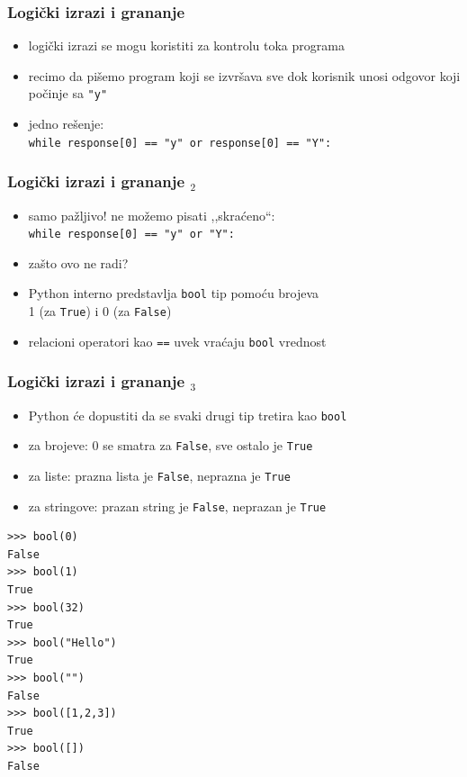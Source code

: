 \documentclass[utf8,compress]{beamer}
\begin{document}
\begin{frame}[fragile]
  \frametitle{Logički izrazi i grananje}
  \begin{itemize}
    \item logički izrazi se mogu koristiti za kontrolu toka programa
    \item recimo da pišemo program koji se izvršava sve dok korisnik unosi odgovor koji počinje sa \texttt{"y"}
    \item jedno rešenje: \\
      \texttt{while response[0] == "y" or response[0] == "Y":}
  \end{itemize}
\end{frame}

\begin{frame}[fragile]
  \frametitle{Logički izrazi i grananje $_2$}
  \begin{itemize}
    \item samo pažljivo! ne možemo pisati ,,skraćeno``: \\
      \texttt{while response[0] == "y" or "Y":}
    \item zašto ovo ne radi?
    \item Python interno predstavlja \texttt{bool} tip pomoću brojeva \\ 1 (za \texttt{True}) i 0 (za \texttt{False})
    \item relacioni operatori kao \texttt{==} uvek vraćaju \texttt{bool} vrednost
  \end{itemize}
\end{frame}

\begin{frame}[fragile,shrink=10]
  \frametitle{Logički izrazi i grananje $_3$}
  \begin{itemize}
    \item Python će dopustiti da se svaki drugi tip tretira kao \texttt{bool}
    \item za brojeve: 0 se smatra za \texttt{False}, sve ostalo je \texttt{True}
    \item za liste: prazna lista je \texttt{False}, neprazna je \texttt{True}
    \item za stringove: prazan string je \texttt{False}, neprazan je \texttt{True}
  \end{itemize}
\begin{verbatim}
>>> bool(0)
False
>>> bool(1)
True
>>> bool(32)
True
>>> bool("Hello")
True
>>> bool("")
False
>>> bool([1,2,3])
True
>>> bool([])
False
\end{verbatim}
\end{frame}
\end{document}

